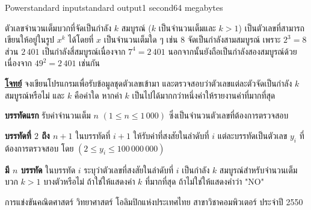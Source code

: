 \documentclass[11pt,a4paper]{article}
\begin{document}
\begin{problem}{Power}{standard input}{standard output}{1 second}{64 megabytes}

ตัวเลขจำนวนเต็มบวกที่จัดเป็นกำลัง $k$ สมบูรณ์ ($k$ เป็นจำนวนเต็มและ $k > 1$) เป็นตัวเลขที่สามารถเขียนให้อยู่ในรูป $x^k$ ได้โดยที่ $x$ เป็นจำนวนเต็มใด ๆ เช่น $8$ จัดเป็นกำลังสามสมบูรณ์ เพราะ $2^3 = 8$ ส่วน $2\,401$ เป็นกำลังสี่สมบูรณ์เนื่องจาก $7^4 = 2\,401$ นอกจากนั้นยังถือเป็นกำลังสองสมบูรณ์ด้วย เนื่องจาก $49^2 = 2\,401$ เช่นกัน


\bigskip
\underline{\textbf{โจทย์}}  จงเขียนโปรแกรมเพื่อรับข้อมูลชุดตัวเลขเข้ามา และตรวจสอบว่าตัวเลขแต่ละตัวจัดเป็นกำลัง $k$ สมบูรณ์หรือไม่ และ $k$ คือค่าใด หากค่า $k$ เป็นไปได้มากกว่าหนึ่งค่าให้รายงานค่าที่มากที่สุด


\InputFile

\textbf{บรรทัดแรก} รับค่าจำนวนเต็ม $n$ $(1 \leq n \leq 1\,000)$ ซึ่งเป็นจำนวนตัวเลขที่ต้องการตรวจสอบ

\textbf{บรรทัดที่ $2$ ถึง $n+1$} ในบรรทัดที่ $i+1$ ให้รับค่าที่สงสัยในลำดับที่ $i$ แต่ละบรรทัดเป็นตัวเลข $y_i$ ที่ต้องการตรวจสอบ โดย $(2 \leq y_i \leq 100\,000\,000)$

\OutputFile

\textbf{มี $n$ บรรทัด} ในบรรทัด $i$ ระบุว่าตัวเลขที่สงสัยในลำดับที่ $i$ เป็นกำลัง $k$ สมบูรณ์สำหรับจำนวนเต็มบวก $k > 1$ บางตัวหรือไม่ ถ้าใช่ให้แสดงค่า $k$ ที่มากที่สุด ถ้าไม่ใช่ให้แสดงคำว่า "NO"

\Examples

\begin{example}
%
\end{example}


\Source

การแข่งขันคณิตศาสตร์ วิทยาศาสตร์ โอลิมปิกแห่งประเทศไทย สาขาวิชาคอมพิวเตอร์ ประจำปี 2550

\end{problem}
\end{document}
